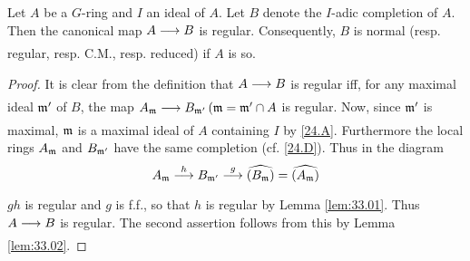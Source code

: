 \documentclass[../main]{subfiles}
\begin{document}
\begin{partheorem}\label{thm:079}

Let $A$ be a $G$-ring and $I$ an ideal of $A$. Let $B$ denote the $I$-adic completion of $A$. Then the canonical map $A \varrightarrow{} B$ is regular. Consequently, $B$ is normal (resp. regular, resp. C.M., resp. reduced) if $A$ is so.\end{partheorem}

\begin{proof} It is clear from the definition that $A \varrightarrow{} B$ is regular iff, for any maximal ideal $\mathfrak{m}'$ of $B$, the map $A_{\ideal{m}} \varrightarrow{} B_{\ideal{m}'}\, (\ideal{m}=\ideal{m}' \cap A$ is regular. Now, since $\mathfrak{m}'$ is maximal, $\mathfrak{m}$ is a maximal ideal of $A$ containing $I$ by \ref{24.A}. Furthermore the local rings $A_{\mathfrak{m}}$ and $B_{\mathfrak{m}'}$ have the same completion (cf. \ref{24.D}). Thus in the diagram
\[A_\ideal{m} \varrightarrow{h} B_{\ideal{m}'} \varrightarrow{g} \completion{(B_{\ideal{m}})} =\completion{(A_\ideal{m})}\]
$g h$ is regular and $g$ is f.f., so that $h$ is regular by Lemma \ref{lem:33.01}. Thus $A \varrightarrow{} B$ is regular. The second assertion
follows from this by Lemma \ref{lem:33.02}.\end{proof}
\end{document}

